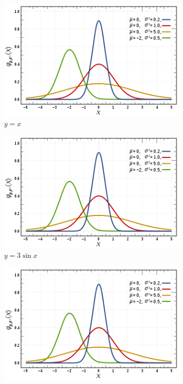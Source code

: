 \begin{figure}[htbp]
    \centering
    \begin{subfigure}[b]{0.3\textwidth}
        \centering
        \includegraphics[width=\textwidth]{figures/gambar.png}
        \caption{$y=x$}
        \label{fig:y equals x}
    \end{subfigure}
    \hfill
    \begin{subfigure}[b]{0.3\textwidth}
        \centering
        \includegraphics[width=\textwidth]{figures/gambar.png}
        \caption{$y=3\sin x$}
        \label{fig:three sin x}
    \end{subfigure}
    \hfill
    \begin{subfigure}[b]{0.3\textwidth}
        \centering
        \includegraphics[width=\textwidth]{figures/gambar.png}

\end{subfigure}
\end{figure}
